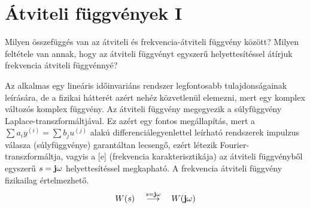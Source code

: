 \documentclass[../main.tex]{subfiles}
\begin{document}
\section{Átviteli függvények I}

\begin{fulltheorem}
  Milyen összefüggés van az átviteli és frekvencia-átviteli függvény között?
  Milyen feltétele van annak, hogy az átviteli függvényt egyszerű
  helyettesítéssel átírjuk frekvencia átviteli függvénnyé?
\end{fulltheorem}

Az  alkalmas egy lineáris időinvariáns rendszer legfontosabb
tulajdonságainak leírására, de a fizikai hátterét azért nehéz közvetlenül
elemezni, mert egy komplex változós komplex függvény. Az átviteli függvény
megegyezik a súlyfüggvény Laplace-transzformáltjával. Ez azért egy fontos
megállapítás, mert a $\sum a_i y^{(i)} = \sum b_j u^{(j)}$ alakú differenciálegyenlettel
leírható rendszerek impulzus válasza (súlyfüggvénye) garantáltan lecsengő,
ezért létezik Fourier-transzformáltja, vagyis a [e]
(frekvencia karakterisztikája) az átviteli függvényből egyszerű $s = \mathbf{j} \omega$
helyettesítéssel megkapható. A frekvencia átviteli függvény fizikailag
értelmezhető.
\[
  W(s) \quad \overset{s = \mathbf{j} \omega}{\longrightarrow} \quad W(\mathbf{j} \omega)
\]
\end{document}
